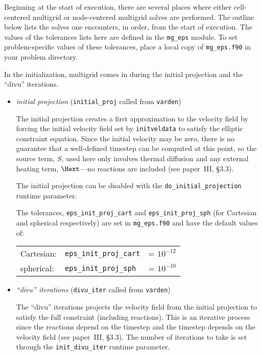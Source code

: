 \label{sec:mgtol}

Beginning at the start of execution, there are several places where
either cell-centered multigrid or node-centered multigrid solves are
performed.  The outline below lists the solves one encounters, in order,
from the start of execution.  The values of the tolerances lists here
are defined in the {\tt mg\_eps} module.  To set problem-specific values
of these tolerances, place a local copy of {\tt mg\_eps.f90} in your
problem directory.

In the initialization, multigrid comes in during the initial projection
and the ``divu'' iterations.

\begin{itemize}

\item {\em initial projection} ({\tt initial\_proj} called from {\tt varden})

  The initial projection creates a first approximation to the velocity
  field by forcing the initial velocity field set by {\tt initveldata}
  to satisfy the elliptic constraint equation.  Since the initial
  velocity may be zero, there is no guarantee that a well-defined
  timestep can be computed at this point, so the source term, $S$,
  used here only involves thermal diffusion and any external heating
  term, $\Hext$---no reactions are included (see paper~III, \S 3.3).

  The initial projection can be disabled with the {\tt do\_initial\_projection}
  runtime parameter.

  The tolerances, {\tt eps\_init\_proj\_cart} and {\tt eps\_init\_proj\_sph}
  (for Cartesian and spherical respectively) are set in {\tt mg\_eps.f90}
  and have the default values of:
   \begin{center}
   \begin{tabular}{lll}
   Cartesian:   &  {\tt eps\_init\_proj\_cart} &= $10^{-12}$ \\
   spherical:   &  {\tt eps\_init\_proj\_sph}  &= $10^{-10}$
   \end{tabular}
   \end{center}


\item {\em ``divu'' iterations} ({\tt divu\_iter} called from {\tt varden})

  The ``divu'' iterations projects the velocity field from the initial
  projection to satisfy the full constraint (including reactions).
  This is an iterative process since the reactions depend on the
  timestep and the timestep depends on the velocity field (see
  paper~III, \S 3.3).  The number of iterations to take is set through
  the {\tt init\_divu\_iter} runtime parameter.


\end{itemize}
